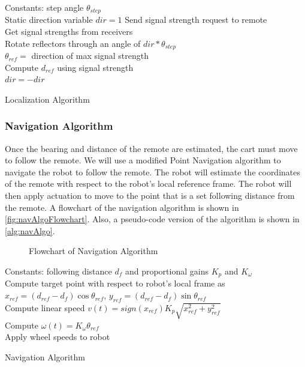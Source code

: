\documentclass[letterpaper,12pt]{article}   %
\begin{document}
\begin{algorithm}[h!]
  \SetAlgoLined
  Constants: step angle $\theta_{step}$\\
  Static direction variable $dir = 1$
  \Begin
  {
    {
      Send signal strength request to remote\\
      Get signal strengths from receivers\\
      Rotate reflectors through an angle of $dir*\theta_{step}$\\
    }
    \Else
    {
      $\theta_{ref} =$ direction of max signal strength\\
      Compute $d_{ref}$ using signal strength\\
      $dir = -dir$\\
    }
  }
  \caption{Localization Algorithm}
  \label{alg:locAlgo}
\end{algorithm}

\subsubsection{Navigation Algorithm}
Once the bearing and distance of the remote are estimated, the cart must move to follow the remote. We will use a modified Point Navigation algorithm to navigate the robot to follow the remote. The robot will estimate the coordinates of the remote with respect to the robot's local reference frame. The robot will then apply actuation to move to the point that is a set following distance from the remote. A flowchart of the navigation algorithm is shown in \autoref{fig:navAlgoFlowchart}. Also, a pseudo-code version of the algorithm is shown in \autoref{alg:navAlgo}.

\begin{figure}
  \centering
  
  \caption{Flowchart of Navigation Algorithm}
  \label{fig:navAlgoFlowchart}
\end{figure}

\begin{algorithm}[h!]
  \SetAlgoLined
  Constants: following distance $d_f$ and proportional gains $K_p$ and $K_\omega$\\
  \Begin
  {
    Compute target point with respect to robot's local frame as $x_{ref} = (d_{ref} - d_f)\cos \theta_{ref}$, $y_{ref} = (d_{ref} - d_f)\sin \theta_{ref}$\\
    Compute linear speed $v(t) = sign(x_{ref})K_p\sqrt{x_{ref}^2 + y_{ref}^2}$\\
    Compute $\omega(t) = K_\omega \theta_{ref}$\\
    Apply wheel speeds to robot\\
  }
  \caption{Navigation Algorithm}
  \label{alg:navAlgo}
\end{algorithm}
\end{document}
